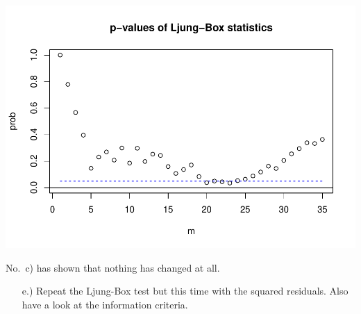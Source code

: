 \documentclass[12pt,a4paper]{article}
\newenvironment{Shaded}{\begin{snugshade}}{\end{snugshade}}
\newcommand{\DataTypeTok}[1]{\textcolor[rgb]{0.13,0.29,0.53}{#1}}
\newcommand{\DecValTok}[1]{\textcolor[rgb]{0.00,0.00,0.81}{#1}}
\newcommand{\KeywordTok}[1]{\textcolor[rgb]{0.13,0.29,0.53}{\textbf{#1}}}
\newcommand{\NormalTok}[1]{#1}
\newcommand{\OperatorTok}[1]{\textcolor[rgb]{0.81,0.36,0.00}{\textbf{#1}}}
\newcommand{\StringTok}[1]{\textcolor[rgb]{0.31,0.60,0.02}{#1}}
\begin{document}
\includegraphics{solution_exercise_5_files/figure-latex/unnamed-chunk-22-1.pdf}

No.~c) has shown that nothing has changed at all.

\begin{itemize}
  \item[e.)] Repeat the Ljung-Box test but this time with the squared residuals. Also have a look at the information criteria. 
\end{itemize}

\begin{Shaded}
\end{Shaded}
\end{document}
